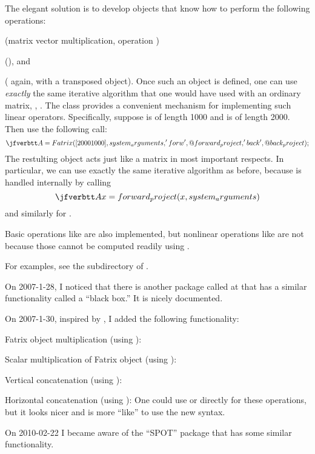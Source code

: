 The elegant solution
is to develop \matlab objects
that know how to perform
the following operations:
\blist
\item
{}
(matrix vector multiplication,
operation )
\item
{}
(), and
\item
{}
( again,
with a transposed object).
\elist
Once such an object is
defined,
one can use \emph{exactly}
the same iterative algorithm
that one would have used
with an ordinary matrix,
\eg,
.
%
The \fatrix class
provides a convenient mechanism
for implementing
such linear operators.
%
Specifically,
suppose \x is of length 1000
and \y is of length 2000.
Then use the following call:
\[
\ty{
A = Fatrix([2000 1000], system_arguments,
 'forw', @forward_project, 'back', @back_project);
}
\]
The restulting \fatrix object 
acts just like a matrix
in most important respects.
In particular,
we can use exactly the same iterative algorithm
 as before,
because
is handled internally
by calling
\[
\ty{
Ax = forward_project(x, system_arguments)
}
\]
and similarly for
.

Basic operations
like 
are also implemented,
but nonlinear operations
like 
are not
because those cannot be computed readily
using . 

For examples, see
the  subdirectory of \irt.

On 2007-1-28,
I noticed that there is another package called 
at 
that has a similar functionality called a ``black box.''
It is nicely documented.

On 2007-1-30,
inspired by ,
I added the following functionality:
\blist
\item
Fatrix object multiplication
(using ): 
\item
Scalar multiplication of Fatrix object
(using ): 
\item
Vertical concatenation (using ):
\item
Horizontal concatenation (using ):
\elist
One could use  or 
directly for these operations,
but it looks nicer
and is more ``\matlab like''
to use the new syntax.

On 2010-02-22 I became aware of the ``SPOT'' package
that has some similar functionality.
